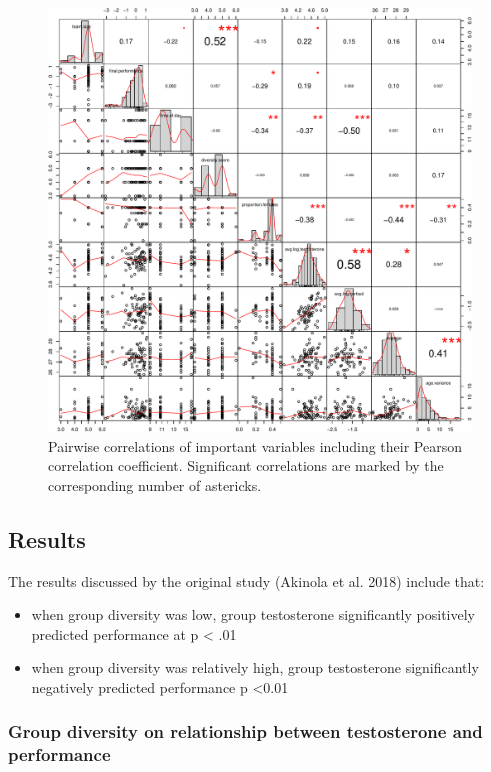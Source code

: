 \documentclass[]{article}
\providecommand{\tightlist}{%
  \setlength{\itemsep}{0pt}\setlength{\parskip}{0pt}}
\begin{document}
\begin{figure}
\centering
\includegraphics{19_10_02_hw5_q1_files/figure-latex/dists-1.pdf}
\caption{\label{fig:pairs}Pairwise correlations of important variables
including their Pearson correlation coefficient. Significant
correlations are marked by the corresponding number of astericks.}
\end{figure}

\hypertarget{results}{%
\subsection{Results}\label{results}}

The results discussed by the original study (Akinola et al. 2018)
include that:

\begin{itemize}
\tightlist
\item
  when group diversity was low, group testosterone significantly
  positively predicted performance at p \textless{} .01
\item
  when group diversity was relatively high, group testosterone
  significantly negatively predicted performance p \textless{}0.01
\end{itemize}

\hypertarget{group-diversity-on-relationship-between-testosterone-and-performance}{%
\subsubsection{Group diversity on relationship between testosterone and
performance}\label{group-diversity-on-relationship-between-testosterone-and-performance}}
\end{document}
